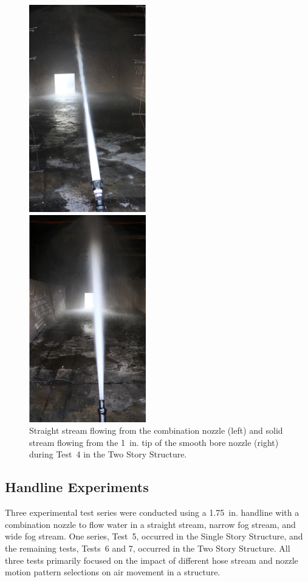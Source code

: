 \documentclass[12pt,oneside]{book}
\begin{document}
\begin{figure}[!ht]
	\minipage{2.15in}
	\begin{center}
		\includegraphics[width=2in]{../Figures/Pictures/SS_70}
	\end{center} 
	\endminipage
	\minipage{2.15in}
	\begin{center}
		\includegraphics[width=2in]{../Figures/Pictures/SB_70}
	\end{center}
	\endminipage
	\caption[Straight stream from combination nozzle and solid stream from smooth bore nozzle with 1~in. tip during Test~4.]{Straight stream flowing from the combination nozzle (left) and solid stream flowing from the 1~in. tip of the smooth bore nozzle (right) during Test~4 in the Two Story Structure.}
	\label{fig:test_4_pic}
\end{figure}
\FloatBarrier

\subsection{Handline Experiments}
\label{sec:handline_procedure}
Three experimental test series were conducted using a 1.75~in. handline with a combination nozzle to flow water in a straight stream, narrow fog stream, and wide fog stream. One series, Test~5, occurred in the Single Story Structure, and the remaining tests, Tests~6 and 7, occurred in the Two Story Structure. All three tests primarily focused on the impact of different hose stream and nozzle motion pattern selections on air movement in a structure. 
\end{document}
